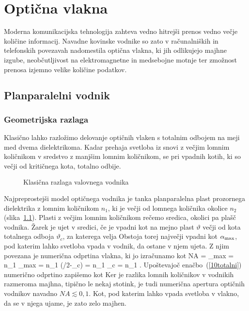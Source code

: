 
\chapter{Optična vlakna}
Moderna komunikacijska tehnologija zahteva vedno hitrejši prenos
vedno večje količine informacij. Navadne kovinske vodnike
so zato v računalniških in telefonskih povezavah nadomestila optična 
vlakna, ki jih odlikujejo majhne izgube, neobčutljivost na elektromagnetne
in medsebojne motnje ter zmožnost prenosa izjemno velike količine podatkov. 

\section{Planparalelni vodnik}
\subsection*{Geometrijska razlaga}
Klasično lahko razložimo delovanje optičnih vlaken s totalnim odbojem
na meji med dvema dielektrikoma. Kadar prehaja svetloba iz snovi 
z večjim lomnim količnikom v sredstvo z manjšim lomnim količnikom,
se pri vpadnih kotih, ki so večji od kritičnega kota, totalno odbije. 
\begin{figure}[h]
\centering
\def\svgwidth{120truemm} 

\caption{Klasična razlaga valovnega vodnika}
\label{fig:vodnik}
\end{figure}

Najpreprostejši model optičnega vodnika je tanka planparalelna plast prozornega
dielektrika z lomnim količnikom $n_{1}$, ki je večji od lomnega količnika
okolice $n_2$ (slika~\ref{fig:vodnik}). 
Plasti z večjim lomnim količnikom rečemo sredica, okolici
pa plašč vodnika. Žarek je ujet v sredici, če je vpadni kot 
na mejno plast $\vartheta$ večji od kota totalnega odboja $\vartheta_c$, 
za katerega velja 
Obstoja torej največji vpadni kot $\alpha_{\rm max}$, pod katerim lahko svetloba vpada v vodnik, da ostane v njem ujeta.
Z njim povezana je numerična odprtina vlakna, ki jo izračunamo kot 
\beq
NA = \sin \alpha_{\rm max} = n_1 \sin \beta_{\rm max} = 
n_1 \sin(\pi/2-\vartheta_c) =
n_1 \cos\vartheta_c = n_1 .
\eeq
Upoštevajoč enačbo~(\ref{10totalni}) numerično odprtino zapišemo kot 
Ker je razlika lomnih količnikov v vodnikih razmeroma majhna,
tipično le nekaj stotink, je tudi numerična apertura optičnih 
vodnikov navadno
$NA \lesssim 0,1 $. Kot, pod katerim lahko vpada svetloba
v vlakno, da se v njega ujame, je zato zelo majhen. 

